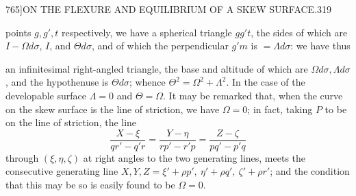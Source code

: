 \documentclass[11pt]{article}
\begin{document}
\begin{center}
{\small 765]\hfill ON THE FLEXURE AND EQUILIBRIUM OF A SKEW SURFACE.\hfill 319}
\end{center}

points $g, g', t$ respectively, we have a spherical triangle $gg't$, the sides of which are
$I - \Omega d\sigma$, $I$, and $\Theta d\sigma$, and of which the perpendicular $g'm$ is $= \Lambda d\sigma$: we have thus

\begin{center}
\end{center}

an infinitesimal right-angled triangle, the base and altitude of which are $\Omega d\sigma, \Lambda d\sigma$,
and the hypothenuse is $\Theta d\sigma$; whence $\Theta^2 = \Omega^2 + \Lambda^2$. In the case of the developable
surface $\Lambda = 0$ and $\Theta = \Omega$. It may be remarked that, when the curve on the skew
surface is the line of striction, we have $\Omega = 0$; in fact, taking $P$ to be on the line
of striction, the line
\[
\frac{X - \xi}{qr' - q'r} = \frac{Y - \eta}{rp' - r'p} = \frac{Z - \zeta}{pq' - p'q}
\]
through $(\xi, \eta, \zeta)$ at right angles to the two generating lines, meets the consecutive
generating line $X, Y, Z = \xi' + \rho p',\ \eta' + \rho q',\ \zeta' + \rho r'$; and the condition that this may
be so is easily found to be $\Omega = 0$.
\end{document}
